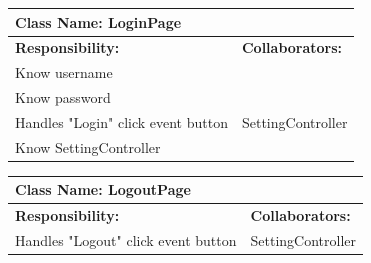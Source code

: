\documentclass[]{article}
\begin{document}
	\begin{table}[H]
	\centering
	\begin{tabular}{|p{6cm}|p{6cm}|}
	\hline 
		\multicolumn{2}{|l|}{\textbf{Class Name: LoginPage}} \\
	\hline
	\textbf{Responsibility:} & \textbf{Collaborators:} \\
	\hline
	Know username & \\ \hline
	Know password & \\ \hline
	Handles "Login" click event button & SettingController\\ \hline
	Know SettingController &\\ \hline
	\end{tabular}
	\end{table}
	
	\begin{table}[H]
	\centering
	\begin{tabular}{|p{6cm}|p{6cm}|}
	\hline 
		\multicolumn{2}{|l|}{\textbf{Class Name: LogoutPage}} \\
	\hline
	\textbf{Responsibility:} & \textbf{Collaborators:} \\
	\hline 
	Handles "Logout" click event button & SettingController\\ \hline
	\end{tabular}
	\end{table}
\end{document}

